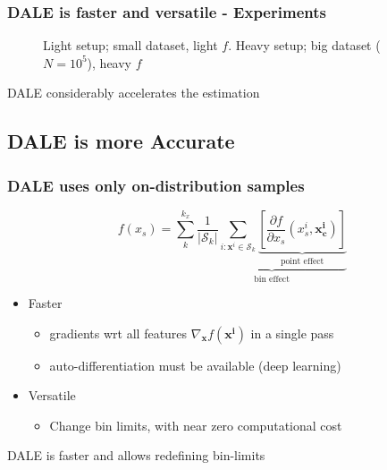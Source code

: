 \documentclass{beamer}
\newcommand{\xb}{\boldsymbol{x}}
\begin{document}
\begin{frame}
  \frametitle{DALE is faster and versatile - Experiments}
  \begin{figure}[h]
  \centering
  \resizebox{.4\columnwidth}{!}{}
  \resizebox{.43\columnwidth}{!}{}
  \caption[Case-1-fig-1]{Light setup; small dataset, light \(f\). Heavy setup; big dataset (\(N=10^5\)), heavy \(f\)}
  \label{fig:case-1-plots-1}
\end{figure}

  \noindent\makebox[\linewidth]{\rule{\paperwidth}{0.4pt}}
  DALE considerably accelerates the estimation
\end{frame}


\subsection{DALE is more Accurate}

\begin{frame}
  \frametitle{DALE uses only on-distribution samples}
    \[f(x_s) = \sum_k^{k_x} \underbrace{\frac{1}{|\mathcal{S}_k|} \sum_{i:\xb^i \in \mathcal{S}_k} \underbrace{[\frac{\partial f}{\partial x_s}(x_s^i, \mathbf{x^i_c})]}_{\text{point effect}}}_{\text{bin effect}} \]

  \begin{itemize}
  \item Faster
    \begin{itemize}
      \item gradients wrt all features \(\nabla_{\mathbf{x}} f(\mathbf{x^i})\) in a single pass
      \item auto-differentiation must be available (deep learning)
    \end{itemize}
  \item Versatile
    \begin{itemize}
    \item Change bin limits, with near zero computational cost
    \end{itemize}

  \end{itemize}
  \noindent\makebox[\linewidth]{\rule{\paperwidth}{0.4pt}}
  DALE is faster and allows redefining bin-limits
\end{frame}
\end{document}
